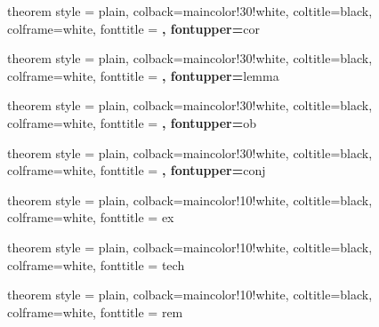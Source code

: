  {theorem style = plain, colback=maincolor!30!white, coltitle=black, colframe=white, fonttitle = \upshape\bfseries,  fontupper=\itshape}{cor}

 {theorem style = plain, colback=maincolor!30!white, coltitle=black, colframe=white, fonttitle = \upshape\bfseries,  fontupper=\itshape}{lemma}

 {theorem style = plain, colback=maincolor!30!white, coltitle=black, colframe=white, fonttitle = \upshape\bfseries,  fontupper=\itshape}{ob}

 {theorem style = plain, colback=maincolor!30!white, coltitle=black, colframe=white, fonttitle = \upshape\bfseries,  fontupper=\itshape}{conj}

 {theorem style = plain, colback=maincolor!10!white, coltitle=black, colframe=white, fonttitle = \upshape\itshape}{ex}

 {theorem style = plain, colback=maincolor!10!white, coltitle=black, colframe=white, fonttitle = \upshape\itshape}{tech}

 {theorem style = plain, colback=maincolor!10!white, coltitle=black, colframe=white, fonttitle = \upshape\itshape}{rem}

\DeclareMathOperator{\adj}{adj} %
\DeclareMathOperator{\im}{im}
\DeclareMathOperator{\coker}{coker}
\DeclareMathOperator{\cone}{cone}
\DeclareMathOperator{\Tot}{Tot}
\DeclareMathOperator{\Hom}{Hom}
\DeclareMathOperator{\Ext}{Ext}
\DeclareMathOperator{\lExt}{\mathcal{E}\mathit{xt}} %
\DeclareMathOperator{\lHom}{\mathcal{H}\mathit{om}} %
\newcommand{\dL}{\mathbf{L}} %
\newcommand{\dR}{\mathbf{R}} %
\newcommand{\mL}{\mathbb{L}} %
\newcommand{\mR}{\mathbb{R}} %
\DeclareMathOperator{\RHom}{\dR Hom} %
\DeclareMathOperator{\RlHom}{\dR\mathcal{H}\mathit{om}} %
\DeclareMathOperator{\RG}{\dR\Gamma} %
\newcommand{\Lotimes}{\otimes^\dL} %
\newcommand{\lperp}[1]{\prescript{\perp}{}{#1}} %
\DeclareMathOperator{\Spec}{Spec}
\DeclareMathOperator{\Proj}{Proj}
\DeclareMathOperator{\Bl}{Bl}
\DeclareMathOperator{\Pic}{Pic}
\DeclareMathOperator{\Coh}{Coh}
\DeclareMathOperator{\QCoh}{QCoh}
\DeclareMathOperator{\Perf}{Perf}
\DeclareMathOperator{\DPerf}{\mathfrak{Perf}}
\newcommand{\MF}{\mathrm{MF}}
\newcommand{\Ab}{\mathrm{Ab}}

